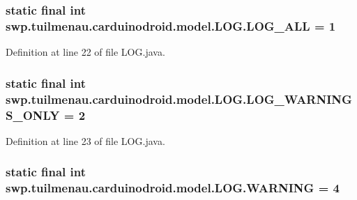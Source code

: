 \subsubsection[{L\+O\+G\+\_\+\+A\+L\+L}]{\setlength{\rightskip}{0pt plus 5cm}static final int swp.\+tuilmenau.\+carduinodroid.\+model.\+L\+O\+G.\+L\+O\+G\+\_\+\+A\+L\+L = 1\hspace{0.3cm}{\ttfamily [static]}}\label{classswp_1_1tuilmenau_1_1carduinodroid_1_1model_1_1_l_o_g_afff29e0c91f6559acbe2e9a26b523260}


Definition at line 22 of file L\+O\+G.\+java.

\hypertarget{classswp_1_1tuilmenau_1_1carduinodroid_1_1model_1_1_l_o_g_a8b2cb22699bc53122a71cc3e579c515e}{}
\subsubsection[{L\+O\+G\+\_\+\+W\+A\+R\+N\+I\+N\+G\+S\+\_\+\+O\+N\+L\+Y}]{\setlength{\rightskip}{0pt plus 5cm}static final int swp.\+tuilmenau.\+carduinodroid.\+model.\+L\+O\+G.\+L\+O\+G\+\_\+\+W\+A\+R\+N\+I\+N\+G\+S\+\_\+\+O\+N\+L\+Y = 2\hspace{0.3cm}{\ttfamily [static]}}\label{classswp_1_1tuilmenau_1_1carduinodroid_1_1model_1_1_l_o_g_a8b2cb22699bc53122a71cc3e579c515e}


Definition at line 23 of file L\+O\+G.\+java.

\hypertarget{classswp_1_1tuilmenau_1_1carduinodroid_1_1model_1_1_l_o_g_a533bd3ed6164b71fdb7c48a238207130}{}
\subsubsection[{W\+A\+R\+N\+I\+N\+G}]{\setlength{\rightskip}{0pt plus 5cm}static final int swp.\+tuilmenau.\+carduinodroid.\+model.\+L\+O\+G.\+W\+A\+R\+N\+I\+N\+G = 4\hspace{0.3cm}{\ttfamily [static]}}\label{classswp_1_1tuilmenau_1_1carduinodroid_1_1model_1_1_l_o_g_a533bd3ed6164b71fdb7c48a238207130}



